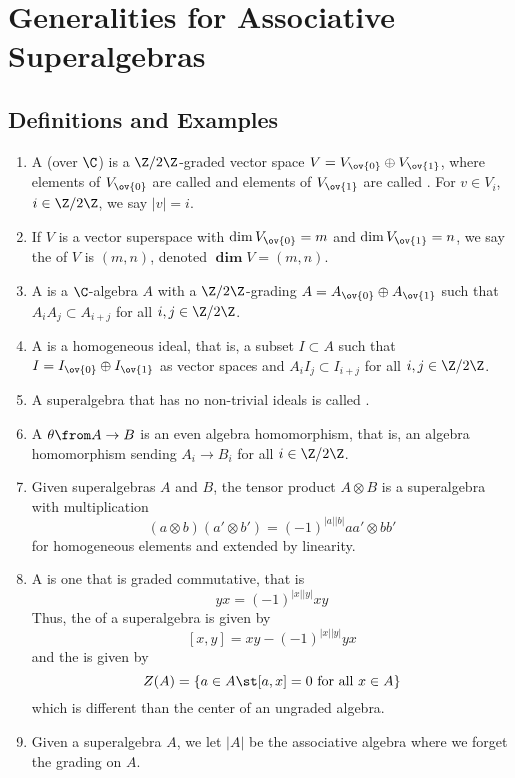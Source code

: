 \documentclass[11pt,leqno,oneside]{amsbook}
\newcommand{\grdim}{\boldsymbol{\dim}}
\numberwithin{thm}{section}
\begin{document}
\section{Generalities for Associative Superalgebras}
\subsection{Definitions and Examples}
\begin{defn}
  \begin{enumerate}
  \item   A  (over \(\C\)) is a
    \(\Z/2\Z\)-graded vector space 
    \(V = V_{\ov{0}} \oplus V_{\ov{1}}\), where elements of
    \(V_{\ov{0}}\) are called  and elements of \(V_{\ov{1}}\)
    are called . For \(v \in V_i\), \(i \in \Z/2\Z\), we say
    \(|v| = i\).
  \item If \(V\) is a vector superspace with \(\dim V_{\ov{0}} = m\)
    and \(\dim V_{\ov{1}} = n\), we say the  of
    \(V\) is \((m,n)\), denoted \(\grdim V = (m,n)\).
  \item A  is a \(\C\)-algebra \(A\) with a
    \(\Z/2\Z\)-grading \(A = A_{\ov{0}} \oplus A_{\ov{1}}\) such that
    \(A_i A_j \subset A_{i+j}\) for all \(i,j \in \Z/2\Z\).
  \item A  is a homogeneous ideal, that is, a
    subset \(I \subset A\) such that \(I = I_{\ov{0}} \oplus
    I_{\ov{1}}\) as vector spaces and \(A_i I_j \subset I_{i+j}\) for all \(i,j \in
    \Z/2\Z\). 
  \item A superalgebra that has no non-trivial ideals is called
    .
  \item A  \(\theta \from A \to B\) is
    an even algebra homomorphism, that is, an algebra homomorphism
    sending \(A_i \to B_i\) for all \(i \in \Z/2\Z\).
  \item Given superalgebras \(A\) and \(B\), the tensor product \(A
    \otimes B\) is a superalgebra with multiplication \[
      (a \otimes b)(a' \otimes b') = (-1)^{|a||b|} aa' \otimes bb'
    \]
    for homogeneous elements and extended by linearity.
  \item A  is one that is graded
    commutative, that is \[
      yx = (-1)^{|x||y|}xy
    \]
    Thus, the  of a superalgebra is given by \[
      [x,y] = xy-(-1)^{|x||y|}yx
    \]
    and the  is given by \[
      Z(A) = \{a \in A \st [a,x] = 0 \text{ for all }x \in A\}
    \]
    which is different than the center of an ungraded algebra.
  \item Given a superalgebra \(A\), we let \(|A|\) be the associative
    algebra where we forget the grading on \(A\). 
  \end{enumerate}
\end{defn}
\end{document}

